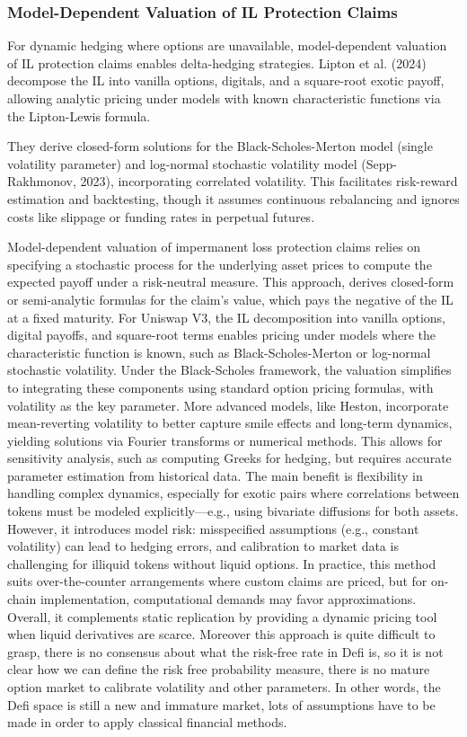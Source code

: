 \documentclass{article}
\begin{document}
\subsubsection{Model-Dependent Valuation of IL Protection Claims}

For dynamic hedging where options are unavailable, model-dependent valuation of IL protection claims enables delta-hedging strategies. Lipton et al. (2024) decompose the IL into vanilla options, digitals, and a square-root exotic payoff, allowing analytic pricing under models with known characteristic functions via the Lipton-Lewis formula.

They derive closed-form solutions for the Black-Scholes-Merton model (single volatility parameter) and log-normal stochastic volatility model (Sepp-Rakhmonov, 2023), incorporating correlated volatility. This facilitates risk-reward estimation and backtesting, though it assumes continuous rebalancing and ignores costs like slippage or funding rates in perpetual futures.

Model-dependent valuation of impermanent loss protection claims relies on specifying a stochastic process for the underlying asset prices to compute the expected payoff under a risk-neutral measure. This approach, derives closed-form or semi-analytic formulas for the claim's value, which pays the negative of the IL at a fixed maturity. For Uniswap V3, the IL decomposition into vanilla options, digital payoffs, and square-root terms enables pricing under models where the characteristic function is known, such as Black-Scholes-Merton or log-normal stochastic volatility.
Under the Black-Scholes framework, the valuation simplifies to integrating these components using standard option pricing formulas, with volatility as the key parameter. More advanced models, like Heston, incorporate mean-reverting volatility to better capture smile effects and long-term dynamics, yielding solutions via Fourier transforms or numerical methods. This allows for sensitivity analysis, such as computing Greeks for hedging, but requires accurate parameter estimation from historical data.
The main benefit is flexibility in handling complex dynamics, especially for exotic pairs where correlations between tokens must be modeled explicitly—e.g., using bivariate diffusions for both assets. However, it introduces model risk: misspecified assumptions (e.g., constant volatility) can lead to hedging errors, and calibration to market data is challenging for illiquid tokens without liquid options. In practice, this method suits over-the-counter arrangements where custom claims are priced, but for on-chain implementation, computational demands may favor approximations. Overall, it complements static replication by providing a dynamic pricing tool when liquid derivatives are scarce.
Moreover this approach is quite difficult to grasp, there is no consensus about what the risk-free rate in Defi is, so it is not clear how we can define the risk free probability measure, there is no mature option market to calibrate volatility and other parameters.
In other words, the Defi space is still a new and immature market, lots of assumptions have to be made in order to apply classical financial methods.
\end{document}

